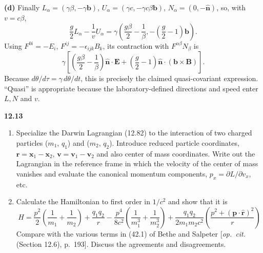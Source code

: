 \medskip\noindent\textbf{(d)} Finally $L_\alpha=(\gamma\beta,-\gamma\mathbf b)$,
$U_\alpha=(\gamma c,-\gamma c\beta\mathbf b)$,
$N_\alpha=(0,-\hat{\mathbf n})$, so, with $v=c\beta$,
\[
\frac g2L_\alpha-\frac1vU_\alpha
=\gamma\left(\frac{g\beta}2-\frac1\beta,
 -\left(\frac g2-1\right)\mathbf b\right).
\]
Using $F^{0i}=-E_i$, $F^{ij}=-\epsilon_{ijk}B_k$, its contraction
with $F^{\alpha\beta}N_\beta$ is
\[
\gamma\left[
\left(\frac{g\beta}2-\frac1\beta\right)\hat{\mathbf n}\cdot\mathbf E
+\left(\frac g2-1\right)\hat{\mathbf n}\cdot(\mathbf b\times\mathbf B)
\right].
\]
Because $d\theta/d\tau=\gamma\,d\theta/dt$, this is precisely the
claimed quasi-covariant expression.  ``Quasi'' is appropriate because
the laboratory-defined directions and speed enter $L,N$ and $v$.

\par\bigskip
\noindent\textbf{12.13}\quad\begin{enumerate}
\item[(a)] Specialize the Darwin Lagrangian (12.82) to the interaction of two charged particles ($m_{1}$, $q_{1}$) and ($m_{2}$, $q_{2}$). Introduce reduced particle coordinates, $\mathbf{r}=\mathbf{x}_{1}-\mathbf{x}_{2}$, $\mathbf{v}=\mathbf{v}_{1}-\mathbf{v}_{2}$ and also center of mass coordinates. Write out the Lagrangian in the reference frame in which the velocity of the center of mass vanishes and evaluate the canonical momentum components, $p_{x}=\partial L/\partial v_{x}$, etc.
\item[(b)] Calculate the Hamiltonian to first order in $1/c^{2}$ and show that it is
\[
H=\frac{p^{2}}{2}\left(\frac{1}{m_{1}}+\frac{1}{m_{2}}\right)+\frac{q_{1}q_{2}}{r}-\frac{p^{4}}{8c^{2}}\left(\frac{1}{m_{1}^{3}}+\frac{1}{m_{2}^{3}}\right)+\frac{q_{1}q_{2}}{2m_{1}m_{2}c^{2}}\left(\frac{p^{2}+(\mathbf{p}\cdot\hat{\mathbf{r}})^{2}}{r}\right)
\]
Compare with the various terms in (42.1) of Bethe and Salpeter [\emph{op.\ cit.} (Section 12.6), p.~193]. Discuss the agreements and disagreements.
\end{enumerate}
\solution

